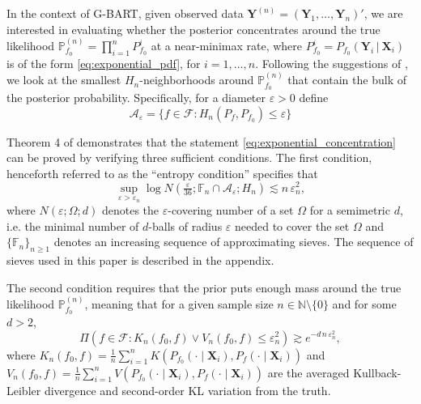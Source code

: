 \documentclass[12pt]{article}
\newcommand{\bm}[1]{\boldsymbol{#1}}
\renewcommand{\P}{\mathbb{P}}
\newcommand{\Y}{\bm{Y}}
\newcommand{\1}{\mathbb{I}}
\def\C {\,|\:}
\def\C {\,|\:}
\def\mF{\mathcal{F}}
\def\Y{\bm{Y}}
\def\X{\bm{X}}
\renewcommand{\P}{\mathbb{P}}
\def\C{\mbox{\boldmath$C$}}
\def\X{\mbox{\boldmath$X$}}
\renewcommand{\Y}{\bm{Y}}
\def\C {\,|\:}
\def\C {\,|\:}
\def\X{\bm{X}}
\theoremstyle{plain}
\theoremstyle{definition}
\theoremstyle{remark}
\begin{document}
In the context of G-BART, given observed data $\Y^{(n)}=(\Y_1,\dots, \Y_n)'$, we are interested in evaluating whether the posterior concentrates around the true likelihood $\P_{f_0}^{(n)} = \prod_{i=1}^n P_{f_0}^{i}$ at a near-minimax rate, where $P_{f_0}^i = P_{f_0}(\Y_i \C \X_i)$ is of the form \eqref{eq:exponential_pdf}, for $i=1,\dots,n$. Following the suggestions of \cite{ghosal2007convergence}, we look at the smallest $H_n$-neighborhoods around $\P_{f_0}^{(n)}$ that contain the bulk of the posterior probability. Specifically, for a diameter $\varepsilon>0$ define 
\begin{equation}\label{eq:A_neighborhood}
\mathcal{A}_{\varepsilon}=\{f \in \mF: H_n(P_f,P_{f_0}) \leq  \varepsilon \}
\end{equation}

Theorem 4 of \cite{ghosal2007convergence} demonstrates that the statement \eqref{eq:exponential_concentration} can be proved by verifying three sufficient conditions. The first condition, henceforth referred to as the ``entropy condition'' specifies that
\begin{equation}\label{eq:entropy1}
\displaystyle \sup_{\varepsilon > \varepsilon_n} \log  N\left(\tfrac{\varepsilon}{36}; \mathbb{F}_n \cap \mathcal{A}_{\varepsilon}; H_n\right) \lesssim n\,\varepsilon_n^2, \tag{C1}
\end{equation}
where $N(\varepsilon; \Omega; d)$ denotes the $\varepsilon$-covering number of a set $\Omega$ for a semimetric $d$,  i.e. the minimal number of $d$-balls of radius $\varepsilon$ needed to cover the set $\Omega$ and $\{\mathbb{F}_n\}_{n \ge 1}$ denotes an increasing sequence of approximating sieves. The sequence of sieves used in this paper is described in the appendix.

The second condition requires that the prior puts enough mass around the true likelihood $\P_{f_0}^{(n)}$, meaning that for a given sample size $n \in \mathbb{N}\setminus \{0\}$ and for some $d>2$,
\begin{equation}\label{eq:prior1}
\displaystyle {\Pi(f \in \mathcal{F}: K_n(f_0,f) \vee V_n(f_0,f) \leq \varepsilon_n^2 )} \gtrsim e^{-d\,n\,\varepsilon_n^2}, \tag{C2}
\end{equation}
where $K_n(f_0,f) = \frac{1}{n}\sum_{i=1}^n K(P_{f_0}(\cdot\mid\X_i), P_f(\cdot\mid\X_i))$ and $V_n(f_0,f) = \frac{1}{n}\sum_{i=1}^n V(P_{f_0}(\cdot\mid\X_i), P_f(\cdot\mid\X_i))$ are the averaged Kullback-Leibler divergence and second-order KL variation from the truth.
\end{document}
